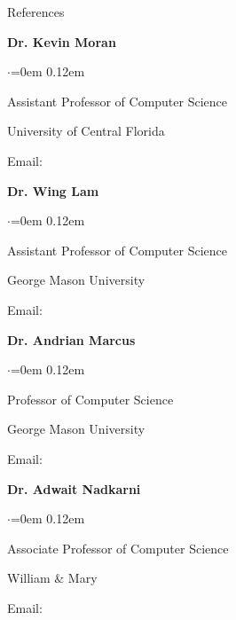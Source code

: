 \documentclass{resume} %
\renewenvironment{rSubsection}[4]{%
 {\bf #1} \hfill {#2}%
 \ifthenelse{\equal{#3}{}}{}{\\{\em #3} \hfill {\em #4}}\smallskip
 \begin{list}{$\cdot$}{\leftmargin=0em}%
  \itemsep -0.5em \vspace{-0.5em}%
 }{%
 \end{list}%
 \vspace{1pt}%
}
\begin{document}
{
\renewenvironment{rSubsection}[4]{%
 {\bf #1} \hfill {#2}%
 \ifthenelse{\equal{#3}{}}{}{\\{\em #3} \hfill {\em #4}}\smallskip
 \begin{list}{$\cdot$}{\leftmargin=0em}%
  \itemsep 0.12em%
 }{%
 \end{list}%
 \vspace{3pt}%
}
\begin{rSection}{References}

\begin{minipage}[t]{0.48\textwidth}
\begin{rSubsection}{Dr. Kevin Moran}{}{}{}
\item Assistant Professor of Computer Science
\item University of Central Florida
\item Email: 
\end{rSubsection}

\begin{rSubsection}{Dr. Wing Lam}{}{}{}
\item Assistant Professor of Computer Science
\item George Mason University
\item Email: 
\end{rSubsection}
\end{minipage}
\hfill
\begin{minipage}[t]{0.48\textwidth}
\begin{rSubsection}{Dr. Andrian Marcus}{}{}{}
\item Professor of Computer Science
\item George Mason University
\item Email: 
\end{rSubsection}

\begin{rSubsection}{Dr. Adwait Nadkarni}{}{}{}
\item Associate Professor of Computer Science
\item William \& Mary
\item Email: 
\end{rSubsection}
\end{minipage}

\end{rSection}
}
\end{document}
